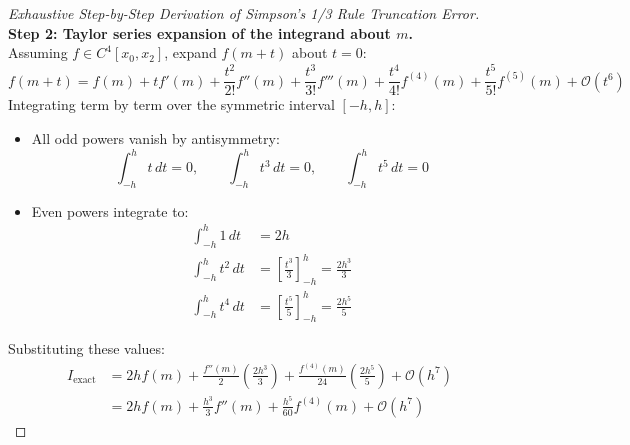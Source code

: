 \begin{proof}[Exhaustive Step-by-Step Derivation of Simpson's 1/3 Rule Truncation Error]
\noindent\textbf{Step 2: Taylor series expansion of the integrand about $m$.} \\
Assuming $f \in C^4[x_0, x_2]$, expand $f(m + t)$ about $t = 0$:
\begin{equation}
    f(m + t) = f(m) + t f'(m) + \frac{t^2}{2!} f''(m) + \frac{t^3}{3!} f'''(m) + \frac{t^4}{4!} f^{(4)}(m) + \frac{t^5}{5!} f^{(5)}(m) + \mathcal{O}(t^6)
\end{equation}
Integrating term by term over the symmetric interval $[-h, h]$:
\begin{itemize}[noitemsep]
    \item All odd powers vanish by antisymmetry:
    \begin{equation}
        \int_{-h}^h t \, dt = 0, \qquad \int_{-h}^h t^3 \, dt = 0, \qquad \int_{-h}^h t^5 \, dt = 0
    \end{equation}
    \item Even powers integrate to:
    \begin{align}
        \int_{-h}^h 1 \, dt &= 2h \\
        \int_{-h}^h t^2 \, dt &= \left[ \frac{t^3}{3} \right]_{-h}^h = \frac{2h^3}{3} \\
        \int_{-h}^h t^4 \, dt &= \left[ \frac{t^5}{5} \right]_{-h}^h = \frac{2h^5}{5}
    \end{align}
\end{itemize}
Substituting these values:
\begin{align}
    I_{\text{exact}} &= 2h f(m) + \frac{f''(m)}{2} \left( \frac{2h^3}{3} \right) + \frac{f^{(4)}(m)}{24} \left( \frac{2h^5}{5} \right) + \mathcal{O}(h^7) \nonumber \\
    \label{eq:simp_exact_expansion}
    &= 2h f(m) + \frac{h^3}{3} f''(m) + \frac{h^5}{60} f^{(4)}(m) + \mathcal{O}(h^7)
\end{align}


\end{proof}
